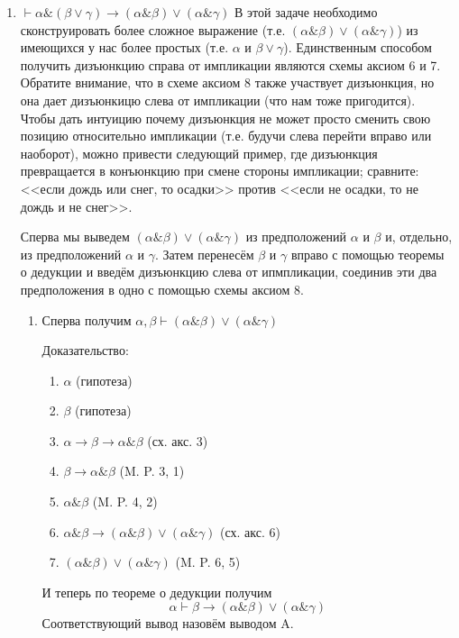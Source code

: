 \documentclass[10pt,a4paper,oneside]{article}
\begin{document}
\begin{enumerate}[label=(\alph*)]
\item $\vdash\alpha\&(\beta\vee\gamma) \rightarrow (\alpha\&\beta)\vee(\alpha\&\gamma)$
\newline
  В этой задаче необходимо сконструировать более сложное выражение (т.е.
  $(\alpha\&\beta)\lor(\alpha\&\gamma)$) из имеющихся у нас более простых
  (т.е. $\alpha$ и $\beta\lor\gamma$). Единственным способом получить дизъюнкцию
  справа от импликации являются схемы аксиом 6 и 7. Обратите внимание, что в
  схеме аксиом 8 также участвует дизъюнкция, но она дает дизъюнкицю слева от
  импликации (что нам тоже пригодится). Чтобы дать интуицию почему дизъюнкция не
  может просто сменить свою позицию относительно импликации (т.е. будучи слева
  перейти вправо или наоборот), можно привести следующий пример, где дизъюнкция
  превращается в конъюнкцию при смене стороны импликации; сравните: <<если дождь
  или снег, то осадки>> против <<если не осадки, то не дождь и не снег>>.

  Сперва мы выведем $(\alpha\&\beta)\vee(\alpha\&\gamma)$ из
  предположений $\alpha$ и $\beta$ и, отдельно, из предположений $\alpha$ и $\gamma$.
  Затем перенесём $\beta$ и $\gamma$ вправо с помощью теоремы о
  дедукции и введём дизъюнкцию слева от ипмпликации, соединив эти два 
  предположения в одно с помощью схемы аксиом 8.

\begin{enumerate}[label=(\Alph*)]
\item Сперва получим $\alpha,\beta\vdash(\alpha\&\beta)\vee(\alpha\&\gamma)$
\newline

  Доказательство:
\begin{enumerate}[label=(\arabic*)]
\item $\alpha$ (гипотеза)
\item $\beta$ (гипотеза)
\item $\alpha\rightarrow\beta\rightarrow\alpha\&\beta$ (сх. акс. 3)
\item $\beta\rightarrow\alpha\&\beta$ (M. P. 3, 1)
\item $\alpha\&\beta$ (M. P. 4, 2)
\item $\alpha\&\beta\rightarrow(\alpha\&\beta)\vee(\alpha\&\gamma)$ (сх. акс. 6)
\item $(\alpha\&\beta)\vee(\alpha\&\gamma)$ (M. P. 6, 5)
\end{enumerate}  
И теперь по теореме о дедукции получим
$$\alpha\vdash\beta\rightarrow(\alpha\&\beta)\vee(\alpha\&\gamma)$$
Соответствующий вывод назовём выводом A.


\end{enumerate}
\end{enumerate}
\end{document}
